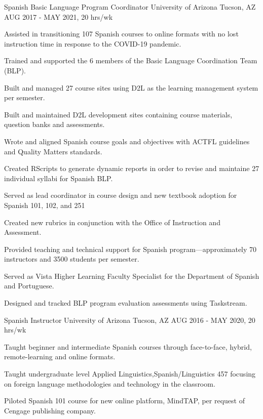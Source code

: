 \begin{cventries}

\cventry
{Spanish Basic Language Program Coordinator} %
{University of Arizona} %
{Tucson, AZ} %
{AUG 2017 - MAY 2021, 20 hrs/wk} %
{ %
\begin{cvitems}
\item {Assisted in transitioning 107 Spanish courses to online formats with no lost instruction time in response to the COVID-19 pandemic.}
\item {Trained and supported the 6 members of the Basic Language Coordination Team (BLP).}
\item {Built and managed 27 course sites using D2L as the learning management system per semester.}
\item {Built and maintained D2L development sites containing course materials, question banks and assessments.}
\item {Wrote and aligned Spanish course goals and objectives with ACTFL guidelines and Quality Matters standards.}
\item {Created RScripts to generate dynamic reports in order to revise and maintaine 27 individual syllabi for Spanish BLP.}
\item {Served as lead coordinator in course design and new textbook adoption for Spanish 101, 102, and 251}
\item {Created new rubrics in conjunction with the Office of Instruction and Assessment.}
\item {Provided teaching and technical support for Spanish program---approximately 70 instructors and 3500 students per semester.}
\item {Served as Vista Higher Learning Faculty Specialist for the Department of Spanish and Portuguese.}
\item {Designed and tracked BLP program evaluation assessments using Taskstream.}
\end{cvitems}
}


\cventry
{Spanish Instructor} %
{University of Arizona} %
{Tucson, AZ} %
{AUG 2016 - MAY 2020, 20 hrs/wk} %
{ %
\begin{cvitems}
\item {Taught beginner and intermediate Spanish courses through face-to-face, hybrid, remote-learning and online formats.}
\item {Taught undergraduate level Applied Linguistics,Spanish/Linguistics 457 focusing on foreign language methodologies and technology in the classroom.} 
\item {Piloted Spanish 101 course for new online platform, MindTAP, per request of Cengage publishing company.}
\end{cvitems}
}


\end{cventries}
